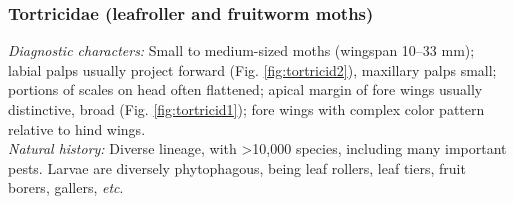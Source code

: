 \documentclass[letterpaper, 11pt]{article}
\begin{document}
\subsubsection{Tortricidae (leafroller and fruitworm moths)}
\noindent{}\textit{Diagnostic characters:} Small to medium-sized moths (wingspan 10--33 mm); labial palps usually project forward (Fig. \ref{fig:tortricid2}), maxillary palps small; portions of scales on head often flattened; apical margin of fore wings usually distinctive, broad (Fig. \ref{fig:tortricid1}); fore wings with complex color pattern relative to hind wings.\\

\noindent{}\textit{Natural history:} Diverse lineage, with \textgreater10,000 species, including many important pests. Larvae are diversely phytophagous, being leaf rollers, leaf tiers, fruit borers, gallers, \textit{etc}.
\end{document}
